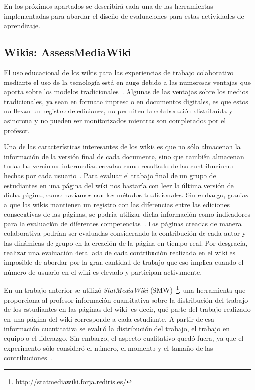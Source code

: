 En los próximos apartados se describirá cada una de las herramientas implementadas para abordar el diseño de evaluaciones para estas actividades de aprendizaje.

\subsection{Wikis: AssessMediaWiki}

El uso educacional de los wikis para las experiencias de trabajo colaborativo mediante el uso de la tecnología está en auge debido a las numerosas ventajas que aporta sobre los modelos tradicionales~\cite{elgort2008wiki}. Algunas de las ventajas sobre los medios tradicionales, ya sean en formato impreso o en documentos digitales, es que estos no llevan un registro de ediciones, no permiten la colaboración distribuída y asincrona y no pueden ser monitorizados mientras son completados por el profesor.

Una de las características interesantes de los wikis es que no sólo almacenan la información de la versión final de cada documento, sino que también almacenan todas las versiones intermedias creadas como resultado de las contribuciones hechas por cada usuario~\cite{trentin2009using}. Para evaluar el trabajo final de un grupo de estudiantes en una página del wiki nos bastaría con leer la última versión de dicha página, como haciamos con los métodos tradicionales. Sin embargo, gracias a que los wikis mantienen un registro con las diferencias entre las ediciones consecutivas de las páginas, se podria utilizar dicha información como indicadores para la evaluación de diferentes competencias~\cite{ortega2011new}. Las páginas creadas de manera colaborativa podrían ser evaluadas considerando la contribución de cada autor y las dinámicas de grupo en la creación de la página en tiempo real. Por desgracia, realizar una evaluación detallada de cada contribución realizada en el wiki es imposible de abordar por la gran cantidad de trabajo que eso implica cuando el número de usuario en el wiki es elevado y participan activamente.

En un trabajo anterior se utilizó \emph{StatMediaWiki} (SMW)~\footnote{http://statmediawiki.forja.rediris.es/}, una herramienta que proporciona al profesor información cuantitativa sobre la distribución del trabajo de los estudiantes en las páginas del wiki, es decir, qué parte del trabajo realizado en una página del wiki corresponde a cada estudiante. A partir de esa información cuantitativa se evaluó la distribución del trabajo, el trabajo en equipo o el liderazgo. Sin embargo, el aspecto cualitativo quedó fuera, ya que el experimento sólo consideró el número, el momento y el tamaño de las contribuciones~\cite{palomo2014assessment}.


